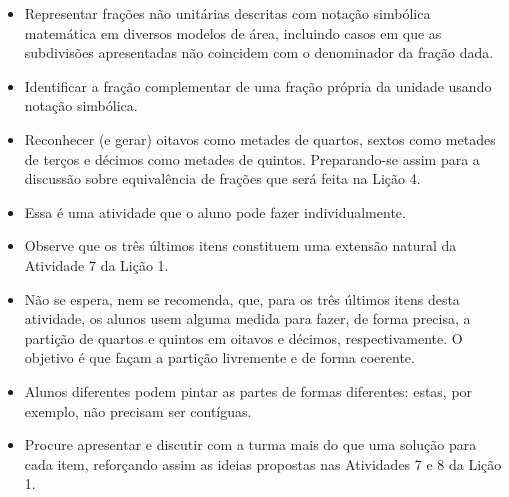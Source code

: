 \begin{multicols}{2}
\begin{objetivos}{}{}
  \begin{itemize} %
    \item       Representar frações não unitárias descritas com notação simbólica matemática em diversos modelos de área, incluindo casos em que as subdivisões apresentadas não coincidem com o denominador da fração dada.
    \item       Identificar a fração complementar de uma fração própria da unidade usando notação simbólica.
    \item       Reconhecer (e gerar) oitavos como metades de quartos, sextos como metades de terços e décimos como metades de quintos. Preparando-se assim para a discussão sobre equivalência de frações que será feita na Lição 4.
\end{itemize} %
\end{objetivos}

\begin{orientacoes}
\begin{itemize} %
    \item       Essa é uma atividade que o aluno pode fazer individualmente.
    \item       Observe que os três últimos itens constituem uma extensão natural da Atividade 7 da Lição 1.
    \item       Não se espera, nem se recomenda, que, para os três últimos itens desta atividade, os alunos usem alguma medida para fazer, de forma precisa, a partição de quartos e quintos em oitavos e décimos, respectivamente. O objetivo é que façam a partição livremente e de forma coerente.
    \item       Alunos diferentes podem pintar as partes de formas diferentes: estas, por exemplo, não precisam ser contíguas.
    \item       Procure apresentar e discutir com a turma mais do que uma solução para cada item, reforçando assim as ideias propostas nas Atividades 7 e 8 da Lição 1.
\end{itemize} %




\end{orientacoes}
\end{multicols}

